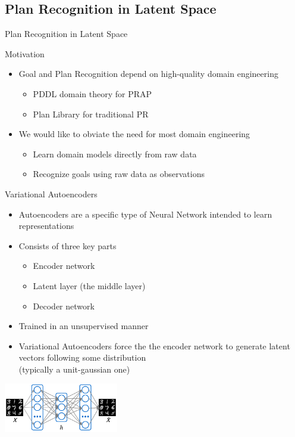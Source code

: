 \documentclass[usenames,dvipsnames]{beamer}
\begin{document}
\subsection{Plan Recognition in Latent Space}

\begin{frame}[c]
	\begin{center}
		\Large{Plan Recognition in Latent Space}
	\end{center}
\end{frame}

\begin{frame}[c]{Motivation}
	\begin{itemize}
		\item Goal and Plan Recognition depend on high-quality domain engineering
		\begin{itemize}
			\item PDDL domain theory for PRAP
			\item Plan Library for traditional PR
		\end{itemize}
		\item We would like to obviate the need for most domain engineering
		\begin{itemize}
			\item Learn domain models directly from raw data
			\item Recognize goals using raw data as observations
		\end{itemize}
	\end{itemize}
\end{frame}

\begin{frame}[c]{Variational Autoencoders}
	\begin{itemize}
		\item Autoencoders are a specific type of Neural Network intended to learn representations
		\item Consists of three key parts
		\begin{itemize}
			\item Encoder network
			\item Latent layer (the middle layer)
			\item Decoder network
		\end{itemize}
		\item Trained in an unsupervised manner
		\item Variational Autoencoders force the the encoder network to generate latent vectors following some distribution \\(typically a unit-gaussian one)
	\end{itemize}
	
	\begin{center}
		\includegraphics[width=5cm]{fig/autoencoder.pdf}
	\end{center}
\end{frame}
\end{document}
